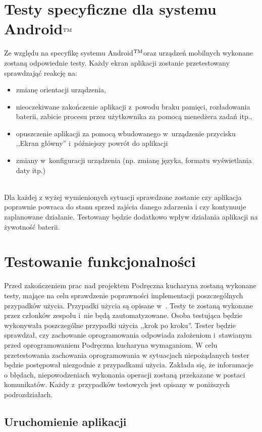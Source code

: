 \documentclass[12pt,leqno, twoside]{mwart}
\def\tm{\leavevmode\hbox{$\rm {}^{TM}$}}
\begin{document}
\section{Testy specyficzne dla systemu Android\tm}
\noindent Ze względu na specyfikę systemu Android\tm oraz urządzeń mobilnych wykonane zostaną odpowiednie testy. Każdy ekran aplikacji zostanie przetestowany sprawdzająć reakcję na:
\begin{itemize}
  \item zmianę orientacji urządzenia,
  \item nieoczekiwane zakończenie aplikacji z~powodu braku pamięci, rozładowania baterii, zabicie procesu przez użytkownika za pomocą menedżera zadań itp.,
  \item opuszczenie aplikacji za pomocą wbudowanego w~urządzenie przycisku ,,Ekran główny'' i~późniejszy powrót do aplikacji
  \item zmiany w~konfiguracji urządzenia (np. zmianę języka, formatu wyświetlania daty itp.)
\end{itemize}

\noindent \\Dla każdej z wyżej wymienionych sytuacji sprawdzone zostanie czy aplikacja poprawnie powraca do stanu sprzed zajścia danego zdarzenia i czy kontynuuje zaplanowane działanie. Testowany będzie dodatkowo wpływ działania aplikacji na żywotność baterii.


\section{Testowanie funkcjonalności}
\noindent Przed zakończeniem prac nad projektem Podręczna kucharyna zostaną wykonane testy, mające na celu sprawdzenie poprawności implementacji poszczególnych przypadków użycia. Przypadki użycia są opisane w~\cite{APU}. Testy te zostaną wykonane przez członków zespołu i~nie będą zautomatyzowane. Osoba testująca będzie wykonywała poszczególne przypadki użycia
,,krok po kroku''. Tester będzie sprawdzał, czy zachowanie oprogramowania odpowiada założeniom i~stawianym przed oprogramowaniem Podręczna kucharyna wymaganiom. W celu przetestowania zachowania oprogramowania w sytuacjach
niepożądanych tester będzie postępował niezgodnie z przypadkami użycia. Zakłada się, że inforamacje o błędach, niepowodzeniach wykonania operacji zostaną przekazane w postaci komunikatów. Każdy z~przypadków testowych jest opisany w poniższych podrozdziałach.

\subsection{Uruchomienie aplikacji}
\end{document}
